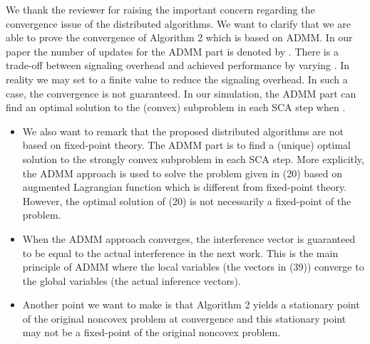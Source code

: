 \begin{enumerate}
 

\resp We thank the reviewer for raising the important concern regarding the convergence issue of the distributed algorithms. We want to clarify that we are able to prove the convergence of Algorithm 2 which is based on \ac{ADMM}. In our paper the number of updates for the \ac{ADMM} part is denoted by . There is a trade-off between signaling overhead and achieved performance by varying . In reality we may set  to a finite value to reduce the signaling overhead. In such a case, the convergence is not guaranteed. In our simulation, the \ac{ADMM} part can find an optimal solution to the (convex) subproblem in each \ac{SCA} step when .

\begin{itemize}
\item We also want to remark that  the proposed distributed algorithms are not based on fixed-point theory. The \ac{ADMM} part is to find a (unique) optimal solution to the strongly convex subproblem in each \ac{SCA} step. More explicitly, the \ac{ADMM} approach is used to solve the problem given in (20) based on augmented Lagrangian function which is different from fixed-point theory. However, the optimal solution of (20) is not necessarily a fixed-point of the problem. 

\item When the ADMM approach converges, the interference vector is guaranteed to be equal to the actual interference in the next work. This is the main principle of \ac{ADMM} where the local variables (the vectors in (39)) converge to the global variables (the actual inference vectors).

\item Another point we want to make is that Algorithm 2 yields a stationary point of the original noncovex problem at convergence and this stationary point may not be a fixed-point of the original noncovex problem. 


\end{itemize}
\end{enumerate}
